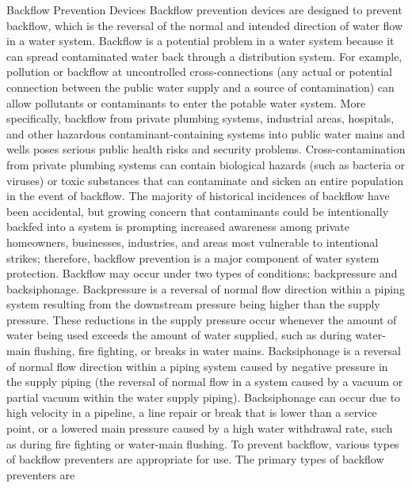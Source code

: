 \documentclass{article}
\begin{document}
Backflow Prevention Devices Backflow prevention devices are designed to
prevent backflow, which is the reversal of the normal and intended
direction of water flow in a water system. Backflow is a potential
problem in a water system because it can spread contaminated water back
through a distribution system. For example, pollution or backflow at
uncontrolled cross-connections (any actual or potential connection
between the public water supply and a source of contamination) can allow
pollutants or contaminants to enter the potable water system. More
specifically, backflow from private plumbing systems, industrial areas,
hospitals, and other hazardous contaminant-containing systems into
public water mains and wells poses serious public health risks and
security problems. Cross-contamination from private plumbing systems can
contain biological hazards (such as bacteria or viruses) or toxic
substances that can contaminate and sicken an entire population in the
event of backflow. The majority of historical incidences of backflow
have been accidental, but growing concern that contaminants could be
intentionally backfed into a system is prompting increased awareness
among private homeowners, businesses, industries, and areas most
vulnerable to intentional strikes; therefore, backflow prevention is a
major component of water system protection. Backflow may occur under two
types of conditions: backpressure and backsiphonage. Backpressure is a
reversal of normal flow direction within a piping system resulting from
the downstream pressure being higher than the supply pressure. These
reductions in the supply pressure occur whenever the amount of water
being used exceeds the amount of water supplied, such as during
water-main flushing, fire fighting, or breaks in water mains.
Backsiphonage is a reversal of normal flow direction within a piping
system caused by negative pressure in the supply piping (the reversal of
normal flow in a system caused by a vacuum or partial vacuum within the
water supply piping). Backsiphonage can occur due to high velocity in a
pipeline, a line repair or break that is lower than a service point, or
a lowered main pressure caused by a high water withdrawal rate, such as
during fire fighting or water-main flushing. To prevent backflow,
various types of backflow preventers are appropriate for use. The
primary types of backflow preventers are
\end{document}
